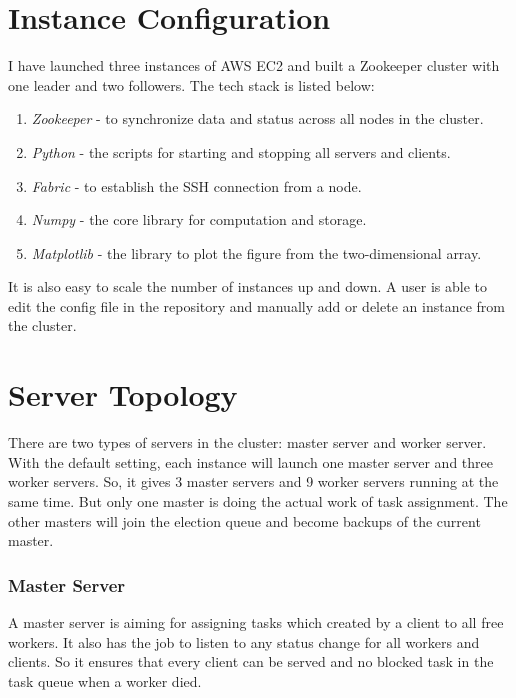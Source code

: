 \documentclass[runningheads,a4paper]{llncs}
\begin{document}
\section{Instance Configuration}

I have launched three instances of AWS EC2\cite{ec2} and built a Zookeeper\cite{zookeeper} cluster with one leader and two followers. The tech stack is listed below:



\begin{enumerate}
\item \emph{Zookeeper} - to synchronize data and status across all nodes in the cluster. 
\item \emph{Python} - the scripts for starting and stopping all servers and clients.
\item \emph{Fabric} - to establish the SSH connection from a node.
\item \emph{Numpy} - the core library for computation and storage.
\item \emph{Matplotlib} - the library to plot the figure from the two-dimensional array.
\end{enumerate}



It is also easy to scale the number of instances up and down. A user is able to edit the config file in the repository and manually add or delete an instance from the cluster.


\section{Server Topology}

There are two types of servers in the cluster: master server and worker server. With the default setting, each instance will launch one master server and three worker servers. So, it gives 3 master servers and 9 worker servers running at the same time. But only one master is doing the actual work of task assignment. The other masters will join the election queue and become backups of the current master. 

\subsubsection{Master Server}

A master server is aiming for assigning tasks which created by a client to all free workers. It also has the job to listen to any status change for all workers and clients. So it ensures that  every client can be served and no blocked task in the task queue when a worker died.
\end{document}
